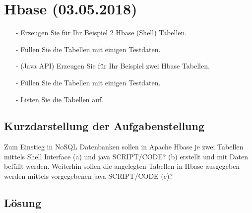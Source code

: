 \section{Hbase (03.05.2018)}
\begin{itemize}
\item[-] Erzeugen Sie für Ihr Beispiel 2 Hbase (Shell) Tabellen.
\item[-] Füllen Sie die Tabellen mit einigen Testdaten.
\item[-] (Java API) Erzeugen Sie für Ihr Beispiel zwei Hbase Tabellen.
\item[-] Füllen Sie die Tabellen mit einigen Testdaten.
\item[-] Listen Sie die Tabellen auf.
\end{itemize}
\subsection*{Kurzdarstellung der Aufgabenstellung}
Zum Einstieg in NoSQL Datenbanken sollen in Apache Hbase je zwei Tabellen mittels Shell Interface (a) und java SCRIPT/CODE? (b) erstellt und mit Daten befüllt werden. Weiterhin sollen die angelegten Tabellen in Hbase ausgegeben werden mittels vorgegebenen java SCRIPT/CODE (c)?
\subsection*{Lösung}

